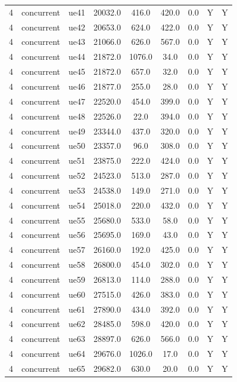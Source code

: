\begin{table}[ht]
\begin{tabular}{|c|c|c|c|c|c|c|c|c|}
4 & concurrent & ue41 & 20032.0 & 416.0 & 420.0 & 0.0 & Y & Y \\
4 & concurrent & ue42 & 20653.0 & 624.0 & 422.0 & 0.0 & Y & Y \\
4 & concurrent & ue43 & 21066.0 & 626.0 & 567.0 & 0.0 & Y & Y \\
4 & concurrent & ue44 & 21872.0 & 1076.0 & 34.0 & 0.0 & Y & Y \\
4 & concurrent & ue45 & 21872.0 & 657.0 & 32.0 & 0.0 & Y & Y \\
4 & concurrent & ue46 & 21877.0 & 255.0 & 28.0 & 0.0 & Y & Y \\
4 & concurrent & ue47 & 22520.0 & 454.0 & 399.0 & 0.0 & Y & Y \\
4 & concurrent & ue48 & 22526.0 & 22.0 & 394.0 & 0.0 & Y & Y \\
4 & concurrent & ue49 & 23344.0 & 437.0 & 320.0 & 0.0 & Y & Y \\
4 & concurrent & ue50 & 23357.0 & 96.0 & 308.0 & 0.0 & Y & Y \\
4 & concurrent & ue51 & 23875.0 & 222.0 & 424.0 & 0.0 & Y & Y \\
4 & concurrent & ue52 & 24523.0 & 513.0 & 287.0 & 0.0 & Y & Y \\
4 & concurrent & ue53 & 24538.0 & 149.0 & 271.0 & 0.0 & Y & Y \\
4 & concurrent & ue54 & 25018.0 & 220.0 & 432.0 & 0.0 & Y & Y \\
4 & concurrent & ue55 & 25680.0 & 533.0 & 58.0 & 0.0 & Y & Y \\
4 & concurrent & ue56 & 25695.0 & 169.0 & 43.0 & 0.0 & Y & Y \\
4 & concurrent & ue57 & 26160.0 & 192.0 & 425.0 & 0.0 & Y & Y \\
4 & concurrent & ue58 & 26800.0 & 454.0 & 302.0 & 0.0 & Y & Y \\
4 & concurrent & ue59 & 26813.0 & 114.0 & 288.0 & 0.0 & Y & Y \\
4 & concurrent & ue60 & 27515.0 & 426.0 & 383.0 & 0.0 & Y & Y \\
4 & concurrent & ue61 & 27890.0 & 434.0 & 392.0 & 0.0 & Y & Y \\
4 & concurrent & ue62 & 28485.0 & 598.0 & 420.0 & 0.0 & Y & Y \\
4 & concurrent & ue63 & 28897.0 & 626.0 & 566.0 & 0.0 & Y & Y \\
4 & concurrent & ue64 & 29676.0 & 1026.0 & 17.0 & 0.0 & Y & Y \\
4 & concurrent & ue65 & 29682.0 & 630.0 & 20.0 & 0.0 & Y & Y \\

\end{tabular}
\end{table}

